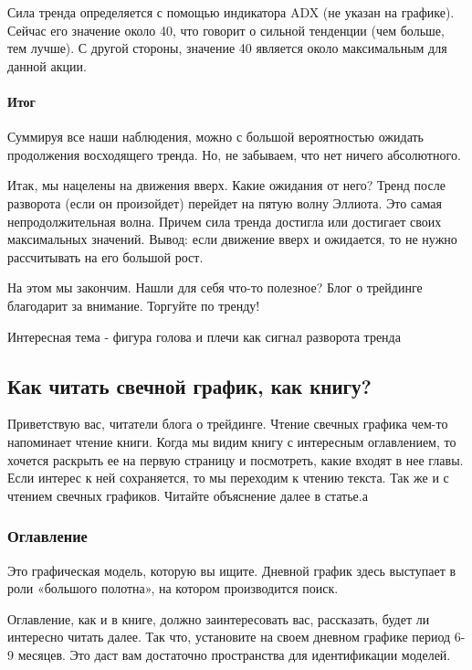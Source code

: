\documentclass{book}
\begin{document}
Сила тренда определяется с помощью индикатора ADX (не указан на
графике). Сейчас его значение около 40, что говорит о сильной
тенденции (чем больше, тем лучше). С другой стороны, значение 40
является около максимальным для данной акции.

\paragraph{Итог}

Суммируя все наши наблюдения, можно с большой вероятностью ожидать продолжения восходящего тренда. Но, не забываем, что нет ничего абсолютного.

Итак, мы нацелены на движения вверх. Какие ожидания от него? Тренд после разворота (если он произойдет) перейдет на пятую волну Эллиота. Это самая непродолжительная волна. Причем сила тренда достигла или достигает своих максимальных значений. Вывод: если движение вверх и ожидается, то не нужно рассчитывать на его большой рост.

На этом мы закончим. Нашли для себя что-то полезное? Блог о трейдинге благодарит за внимание. Торгуйте по тренду!


Интересная тема - фигура голова и плечи как сигнал разворота тренда

\subsection{Как читать свечной график, как книгу?}

Приветствую вас, читатели блога о трейдинге. Чтение свечных графика
чем-то напоминает чтение книги. Когда мы видим книгу с интересным
оглавлением, то хочется раскрыть ее на первую страницу и посмотреть,
какие входят в нее главы. Если интерес к ней сохраняется, то мы
переходим к чтению текста. Так же и с чтением свечных
графиков. Читайте объяснение далее в статье.а

\subsubsection{Оглавление}

Это графическая модель, которую вы ищите. Дневной график здесь выступает в роли «большого полотна», на котором производится поиск.

Оглавление, как и в книге, должно заинтересовать вас, рассказать, будет ли интересно читать далее. Так что, установите на своем дневном графике период 6-9 месяцев. Это даст вам достаточно пространства для идентификации моделей.
\end{document}
